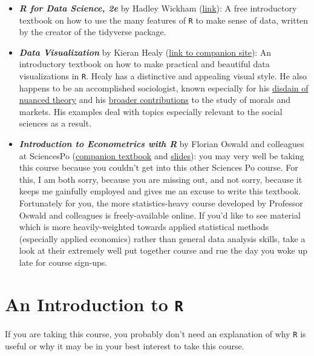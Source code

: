 \documentclass[
]{book}
\providecommand{\tightlist}{%
  \setlength{\itemsep}{0pt}\setlength{\parskip}{0pt}}
\begin{document}
\begin{itemize}
\tightlist
\item
  \textbf{\emph{R for Data Science, 2e}} by Hadley Wickham (\href{https://r4ds.hadley.nz/}{link}): A free introductory textbook on how to use the many features of \texttt{R} to make sense of data, written by the creator of the tidyverse package.
\item
  \textbf{\emph{Data Visualization}} by Kieran Healy (\href{https://socviz.co/}{link to companion site}): An introductory textbook on how to make practical and beautiful data visualizations in \texttt{R}. Healy has a distinctive and appealing visual style. He also happens to be an accomplished sociologist, known especially for his \href{https://kieranhealy.org/files/papers/fuck-nuance.pdf}{disdain of nuanced theory} and his \href{https://kieranhealy.org/publications/}{broader contributions} to the study of morals and markets. His examples deal with topics especially relevant to the social sciences as a result.
\item
  \textbf{\emph{Introduction to Econometrics with R}} by Florian Oswald and colleagues at SciencesPo (\href{https://scpoecon.github.io/ScPoEconometrics/index.html}{companion textbook} and \href{https://github.com/ScPoEcon/ScPoEconometrics-Slides}{slides}): you may very well be taking this course because you couldn't get into this other Sciences Po course. For this, I am both sorry, because you are missing out, and not sorry, because it keeps me gainfully employed and gives me an excuse to write this textbook. Fortunately for you, the more statistics-heavy course developed by Professor Oswald and colleagues is freely-available online. If you'd like to see material which is more heavily-weighted towards applied statistical methods (especially applied economics) rather than general data analysis skills, take a look at their extremely well put together course and rue the day you woke up late for course sign-ups.
\end{itemize}

\hypertarget{an-introduction-to-r}{%
\chapter{\texorpdfstring{An Introduction to \texttt{R}}{An Introduction to R}}\label{an-introduction-to-r}}

If you are taking this course, you probably don't need an explanation of why \texttt{R} is useful or why it may be in your best interest to take this course.
\end{document}
